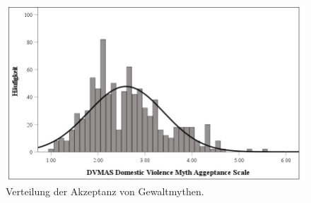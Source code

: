 \begin{figure}[htb]
    \centering
        \includegraphics[width=0.8\linewidth]{Histogramm DVMAS.jpg}
        \caption[Histogramm DVMAS]{Verteilung der Akzeptanz von Gewaltmythen.}
        \label{Histogramm DVMAS}
\end{figure}

